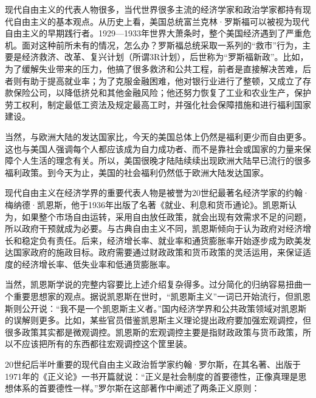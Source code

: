 现代自由主义的代表人物很多，当代世界很多主流的经济学家和政治学家都持有现代自由主义的基本观点。从历史上看，美国总统富兰克林·罗斯福可以被视为现代自由主义的早期践行者。1929—1933年世界大萧条时，整个美国经济遇到了严重危机。面对这种前所未有的情况，怎么办？罗斯福总统采取一系列的“救市”行为，主要是经济救济、改革、复兴计划（所谓3R计划），后世称为“罗斯福新政”。比如，为了缓解失业带来的压力，他搞了很多救济和公共工程，前者是直接解决苦难，后者则有助于提高就业率；为了克服金融困难，他对银行业进行了整顿，又成立了存款保险公司，以降低挤兑和其他金融风险；他还努力恢复了工业和农业生产，保护劳工权利，制定最低工资法及规定最高工时，并强化社会保障措施和进行福利国家建设。

当然，与欧洲大陆的发达国家比，今天的美国总体上仍然是福利更少而自由更多。这也与美国人强调每个人都应该成为自力成功者、而不是靠社会或国家的力量来保障个人生活的理念有关。所以，美国很晚才陆陆续续出现欧洲大陆早已流行的很多福利政策。到今天为止，美国的社会福利仍然低于欧洲大陆发达国家。

现代自由主义在经济学界的重要代表人物是被誉为20世纪最著名经济学家的约翰·梅纳德·凯恩斯，他于1936年出版了名著《就业、利息和货币通论》。凯恩斯认为，如果整个市场自由运转，采用自由放任政策，就会出现有效需求不足的问题，所以政府干预就成为必要。与古典自由主义不同，凯恩斯倾向于认为政府对经济增长和稳定负有责任。后来，经济增长率、就业率和通货膨胀率开始逐步成为欧美发达国家政府的施政目标。政府需要通过财政政策和货币政策的灵活运用，来保证适度的经济增长率、低失业率和低通货膨胀率。

当然，凯恩斯学说的完整内容要比上述介绍复杂得多。过分简化的归纳容易扭曲一个重要思想家的观点。据说凯恩斯在世时，“凯恩斯主义”一词已开始流行，但凯恩斯则公开说：“我不是一个凯恩斯主义者。”国内经济学界和公共政策领域对凯恩斯的误解则更多。比如，某些官员借鉴凯恩斯主义理论提出政府要加强宏观调控，但很多政策其实都是微观调控。凯恩斯的宏观调控主要是指财政政策与货币政策，所以不应该把所有的东西都往宏观调控这个筐里装。

20世纪后半叶重要的现代自由主义政治哲学家约翰·罗尔斯，在其名著、出版于1971年的《正义论》一书开篇就说：“正义是社会制度的首要德性，正像真理是思想体系的首要德性一样。”罗尔斯在这部著作中阐述了两条正义原则：


